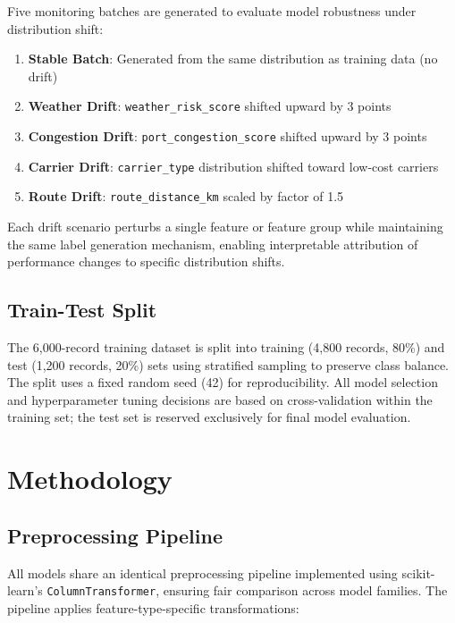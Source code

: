 \documentclass[11pt,a4paper]{article}
\begin{document}
Five monitoring batches are generated to evaluate model robustness under distribution shift:

\begin{enumerate}
    \item \textbf{Stable Batch}: Generated from the same distribution as training data (no drift)
    \item \textbf{Weather Drift}: \texttt{weather\_risk\_score} shifted upward by 3 points
    \item \textbf{Congestion Drift}: \texttt{port\_congestion\_score} shifted upward by 3 points
    \item \textbf{Carrier Drift}: \texttt{carrier\_type} distribution shifted toward low-cost carriers
    \item \textbf{Route Drift}: \texttt{route\_distance\_km} scaled by factor of 1.5
\end{enumerate}

Each drift scenario perturbs a single feature or feature group while maintaining the same label generation mechanism, enabling interpretable attribution of performance changes to specific distribution shifts.

\subsection{Train-Test Split}

The 6,000-record training dataset is split into training (4,800 records, 80\%) and test (1,200 records, 20\%) sets using stratified sampling to preserve class balance. The split uses a fixed random seed (42) for reproducibility. All model selection and hyperparameter tuning decisions are based on cross-validation within the training set; the test set is reserved exclusively for final model evaluation.


\section{Methodology}
\label{sec:methods}

\subsection{Preprocessing Pipeline}

All models share an identical preprocessing pipeline implemented using scikit-learn's \texttt{ColumnTransformer}, ensuring fair comparison across model families. The pipeline applies feature-type-specific transformations:
\end{document}
